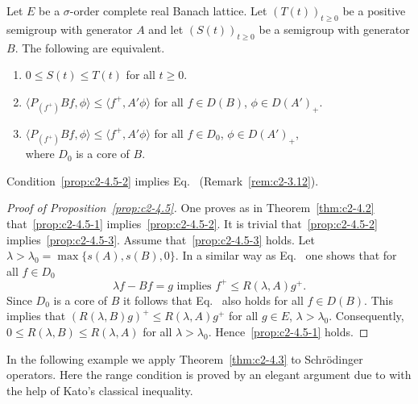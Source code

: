 \begin{proposition}\label{prop:c2-4.5}
Let $E$ be a $\sigma$-order complete real Banach lattice.
Let $(T(t))_{t \geq 0}$ be a positive semigroup with generator $A$ and let
$(S(t))_{t \geq 0}$ be a semigroup with generator $B$. The following are equivalent.
\begin{enumerate}[\upshape (a)]
\item \label{prop:c2-4.5-1}
$0 \leq S(t) \leq T(t)$ for all $t \geq 0$.
\item \label{prop:c2-4.5-2}
$\langle P_{(f^{+})}Bf,\phi\rangle \leq \langle f^{+},A'\phi\rangle$ for all $f \in D(B)$, $\phi \in D(A')_{+}$.
\item \label{prop:c2-4.5-3}
$\langle P_{(f^{+})}Bf,\phi\rangle \leq \langle f^{+},A'\phi\rangle$ for all $f \in D_{0}$, $\phi \in D(A')_{+}$,\\
where $D_{0}$ is a core of\/ $B$.
\end{enumerate}
\end{proposition}
\begin{remark}\label{rem:c2-4.6}
Condition~\ref{prop:c2-4.5-2}   implies Eq.~ (\cf Remark~\ref{rem:c2-3.12}).
\end{remark}
\begin{proof}[Proof of Proposition~\ref{prop:c2-4.5}]
One proves as in Theorem~\ref{thm:c2-4.2}   that~\ref{prop:c2-4.5-1} implies~\ref{prop:c2-4.5-2}.
It is trivial that~\ref{prop:c2-4.5-2}   implies~\ref{prop:c2-4.5-3}. 
Assume that~\ref{prop:c2-4.5-3}   holds. 
Let $\lambda > \lambda_{0} = \max \{s(A),s(B),0\}$. 
In a similar way as Eq.~ one shows that for all $f \in D_{0}$
\begin{equation}\label{eq:c2-4.10}
\lambda f - Bf = g \text{ implies } f^{+} \leq R(\lambda,A)g^{+}.
\end{equation}
Since $D_{0}$ is a core of\/ $B$ it follows that Eq.~ also holds for all $f \in D(B)$. 
This implies that $(R(\lambda,B)g)^{+} \leq R(\lambda,A)g^{+}$ for all $g \in E$, $\lambda > \lambda_{0}$. 
Consequently, $0 \leq R(\lambda,B) \leq R(\lambda,A)$ for all $\lambda > \lambda_{0}$. 
Hence~\ref{prop:c2-4.5-1}   holds.
\end{proof}

In the following example we apply Theorem~\ref{thm:c2-4.3} to Schrödinger operators. 
Here the range condition is proved by an elegant argument due to \textcite{kato:1986} with the help of Kato's classical inequality.

